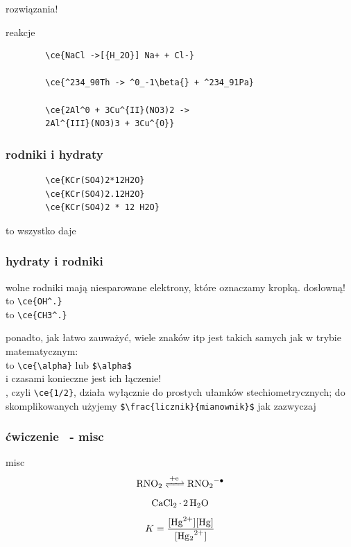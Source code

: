 \documentclass{beamer}
\theoremstyle{newblock}
\begin{document}
\begin{frame}[fragile=singleslide]{rozwiązania!}
\begin{exampleblock}{reakcje}
    \begin{verbatim}
        \ce{NaCl ->[{H_2O}] Na+ + Cl-}

        \ce{^234_90Th -> ^0_-1\beta{} + ^234_91Pa}

        \ce{2Al^0 + 3Cu^{II}(NO3)2 ->
        2Al^{III}(NO3)3 + 3Cu^{0}}
    \end{verbatim} 
\end{exampleblock}
\end{frame}
\begin{frame}[fragile]
    \frametitle{rodniki i hydraty}
    \begin{verbatim}
        \ce{KCr(SO4)2*12H2O}
        \ce{KCr(SO4)2.12H2O}
        \ce{KCr(SO4)2 * 12 H2O} \end{verbatim}
     to wszystko daje \vspace{2mm}
\end{frame}
\begin{frame}[fragile]
    \frametitle{hydraty i rodniki}
    wolne rodniki mają niesparowane elektrony, które oznaczamy kropką. dosłowną!\\ \vspace{2mm}
      to \verb|\ce{OH^.}| \\
      to \verb|\ce{CH3^.}|
\end{frame}
\begin{frame}[fragile]
    ponadto, jak łatwo zauważyć, wiele znaków itp jest takich samych jak w trybie matematycznym:\\
    \ce{\alpha } to \verb|\ce{\alpha}| lub \verb|$\alpha$|\\\vspace{3mm}
    \pause i czasami konieczne jest ich łączenie!\\
    , czyli \verb|\ce{1/2}|, działa wyłącznie do prostych ułamków stechiometrycznych; do skomplikowanych użyjemy \verb|$\frac{licznik}{mianownik}$| jak zazwyczaj
\end{frame}
\begin{frame}[fragile=singleslide]
    \frametitle{ćwiczenie \showmycounter \ - misc} 
    \begin{exampleblock}{misc}
        \begin{equation}
            \ce{RNO2 <=>[+e] RNO2^{-.}}
        \end{equation}
        \begin{equation}
            \ce{CaCl2.2H2O}
        \end{equation}
        \begin{equation}
            K = \frac{[\ce{Hg^2+}][\ce{Hg}]}{[\ce{Hg2^2+}]}
        \end{equation}
    \end{exampleblock}
\end{frame}
\end{document}
